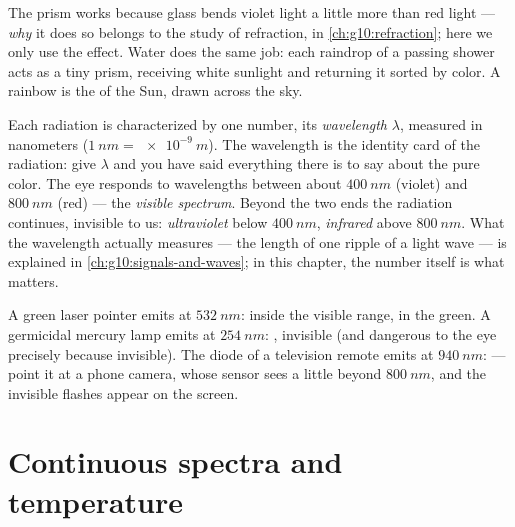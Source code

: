 \begin{remark}\label{rem:g10:light-spectra:rainbow}
The prism works because glass bends violet light a little more than red
light --- \emph{why} it does so belongs to the study of refraction, in
\cref{ch:g10:refraction}; here we only use the effect. Water does the same
job: each raindrop of a passing shower acts as a tiny prism, receiving
white sunlight and returning it sorted by color. A rainbow is the 
of the Sun, drawn across the sky.
\end{remark}

\begin{definition}\label{def:g10:light-spectra:wavelength}
Each  radiation is characterized by one number, its
\emph{wavelength} $\lambda$, measured in nanometers
($\qty{1}{nm} = \qty{e-9}{m}$). The wavelength is the identity card of the
radiation: give $\lambda$ and you have said everything there is to say
about the pure color. The eye responds to wavelengths between about
$\qty{400}{nm}$ (violet) and $\qty{800}{nm}$ (red) --- the \emph{visible
spectrum}. Beyond the two ends the radiation
continues, invisible to us: \emph{ultraviolet} below
$\qty{400}{nm}$, \emph{infrared} above $\qty{800}{nm}$.
What the wavelength actually measures --- the length of one ripple of a
light wave --- is explained in \cref{ch:g10:signals-and-waves}; in this
chapter, the number itself is what matters.
\end{definition}

\begin{example}\label{ex:g10:light-spectra:classify}
A green laser pointer emits at $\qty{532}{nm}$: inside the visible range,
in the green. A germicidal mercury lamp emits at $\qty{254}{nm}$:
, invisible (and dangerous to the eye precisely because
invisible). The diode of a television remote emits at $\qty{940}{nm}$:
 --- point it at a phone camera, whose sensor sees a little beyond
$\qty{800}{nm}$, and the invisible flashes appear on the screen.
\end{example}

\section{Continuous spectra and temperature}

